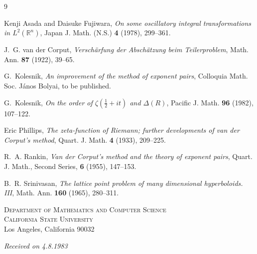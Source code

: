 \documentclass[10pt]{article}
\begin{document}
\begin{thebibliography}{9}

Kenji Asada and Daisuke Fujiwara,
\textit{On some oscillatory integral transformations in $L^2(\mathbb R^n)$},
Japan J. Math. (N.S.) \textbf{4} (1978), 299--361.

J.~G. van der Corput,
\textit{Verschärfung der Abschätzung beim Teilerproblem},
Math. Ann. \textbf{87} (1922), 39--65.

G.~Kolesnik,
\textit{An improvement of the method of exponent pairs},
Colloquia Math. Soc. János Bolyai, to be published.

G.~Kolesnik,
\textit{On the order of $\zeta(\tfrac12+it)$ and $\Delta(R)$},
Pacific J. Math. \textbf{96} (1982), 107--122.

Eric Phillips,
\textit{The zeta-function of Riemann; further developments of van der Corput's method},
Quart. J. Math. \textbf{4} (1933), 209--225.

R.~A. Rankin,
\textit{Van der Corput's method and the theory of exponent pairs},
Quart. J. Math., Second Series, \textbf{6} (1955), 147--153.

B.~R. Srinivasan,
\textit{The lattice point problem of many dimensional hyperboloids. III},
Math. Ann. \textbf{160} (1965), 280--311.

\end{thebibliography}

\bigskip
\begin{flushleft}
\textsc{Department of Mathematics and Computer Science}\\
\textsc{California State University}\\
Los Angeles, California 90032
\end{flushleft}

\begin{flushright}
\textit{Received on 4.8.1983}
\end{flushright}
\end{document}
